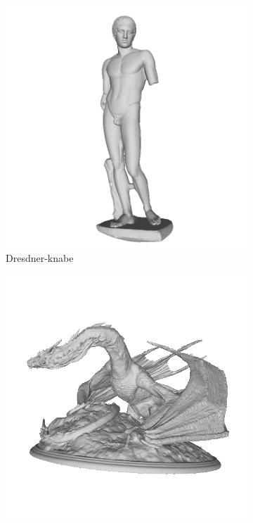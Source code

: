 \begin{figure}[!h]
	\begin{subfigure}[b]{0.23\linewidth}
		\includegraphics[width=\linewidth]{./Figures/train-dataset/16.dresdner-knabe.png}
		\caption{Dresdner-knabe}
	\end{subfigure}
	\begin{subfigure}[b]{0.23\linewidth}
		\includegraphics[width=\linewidth]{./Figures/train-dataset/17.fantasy-dragon.png}

\end{subfigure}
\end{figure}
